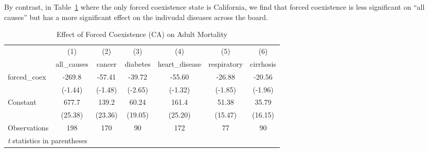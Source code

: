 \documentclass[12pt]{article}
\begin{document}
By contrast, in Table~\ref{adult1} where the only forced coexistence state is California, we find that forced coexistence is less significant on ``all causes'' but has a more significant effect on the indivudal diseases across the board.

\begin{table}[htbp]\centering \caption{Effect of Forced Coexistence (CA) on Adult Mortality\label{adult1}} \begin{tabular}{l*{6}{c}} \toprule
                    &\multicolumn{1}{c}{(1)}&\multicolumn{1}{c}{(2)}&\multicolumn{1}{c}{(3)}&\multicolumn{1}{c}{(4)}&\multicolumn{1}{c}{(5)}&\multicolumn{1}{c}{(6)}\\
                    &\multicolumn{1}{c}{all\_causes}&\multicolumn{1}{c}{cancer}&\multicolumn{1}{c}{diabetes}&\multicolumn{1}{c}{heart\_disease}&\multicolumn{1}{c}{respiratory}&\multicolumn{1}{c}{cirrhosis}\\
\midrule
forced\_coex         &      -269.8&      -57.41&      -39.72&      -55.60&      -26.88&      -20.56\\
                    &     (-1.44)&     (-1.48)&     (-2.65)&     (-1.32)&     (-1.85)&     (-1.96)\\
\addlinespace
Constant            &       677.7&       139.2&       60.24&       161.4&       51.38&       35.79\\
                    &     (25.38)&     (23.36)&     (19.05)&     (25.20)&     (15.47)&     (16.15)\\
\midrule
Observations        &         198&         170&          90&         172&          77&          90\\
\bottomrule
\multicolumn{7}{l}{\footnotesize \textit{t} statistics in parentheses}\\
\end{tabular}
\end{table}
\end{document}
